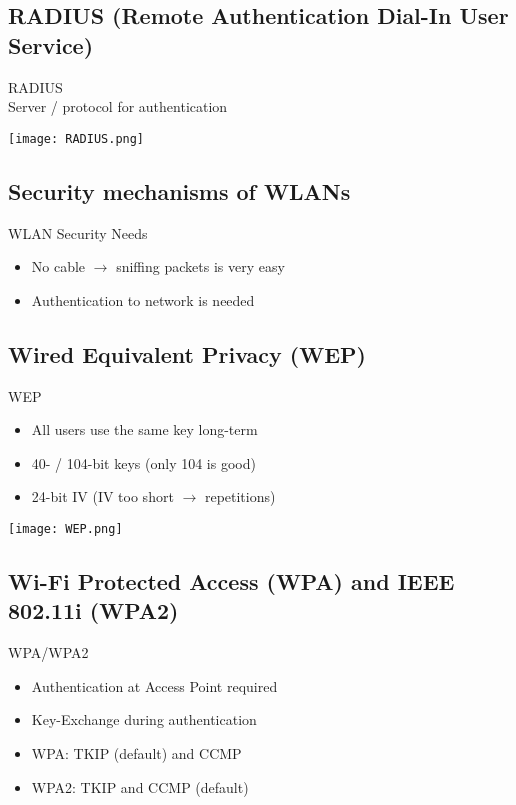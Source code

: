 \subsection{RADIUS (Remote Authentication Dial-In User Service)}

\begin{definition}{RADIUS}\\
    Server / protocol for authentication
\end{definition}

\texttt{[image: RADIUS.png]}

\subsection{Security mechanisms of WLANs}

\begin{concept}{WLAN Security Needs}\\
    \begin{itemize}
        \item No cable $\rightarrow$ sniffing packets is very easy
        \item Authentication to network is needed
    \end{itemize}
\end{concept}

\subsection{Wired Equivalent Privacy (WEP)}

\begin{definition}{WEP}\\
    \begin{itemize}
        \item All users use the same key long-term
        \item 40- / 104-bit keys (only 104 is good)
        \item 24-bit IV (IV too short $\rightarrow$ repetitions)
    \end{itemize}
\end{definition}

\texttt{[image: WEP.png]}

\subsection{Wi-Fi Protected Access (WPA) and IEEE 802.11i (WPA2)}

\begin{concept}{WPA/WPA2}\\
    \begin{itemize}
        \item Authentication at Access Point required
        \item Key-Exchange during authentication
        \item WPA: TKIP (default) and CCMP
        \item WPA2: TKIP and CCMP (default)
    \end{itemize}
\end{concept}

